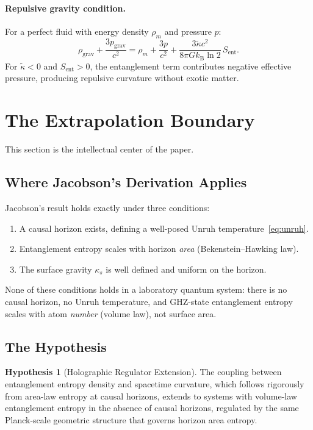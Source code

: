 \documentclass[12pt,letterpaper]{article}
\theoremstyle{plain}
\theoremstyle{definition}
\newtheorem{hypothesis}[theorem]{Hypothesis}
\theoremstyle{remark}
\newcommand{\kB}{k_{\mathrm{B}}}
\newcommand{\lnTwo}{\ln 2}
\newcommand{\kt}{\tilde{\kappa}}
\newcommand{\Sent}{S_{\mathrm{ent}}}
\begin{document}
\paragraph{Repulsive gravity condition.}
For a perfect fluid with energy density $\rho_{m}$ and pressure $p$:
\begin{equation}
  \rho_{\mathrm{grav}} + \frac{3p_{\mathrm{grav}}}{c^{2}}
  = \rho_{m} + \frac{3p}{c^{2}}
    + \frac{3\kt c^{2}}{8\pi G\kB\lnTwo}\,\Sent.
  \label{eq:source}
\end{equation}
For $\kt < 0$ and $\Sent > 0$, the entanglement term contributes negative effective pressure,
producing repulsive curvature without exotic matter.

\section{The Extrapolation Boundary}
\label{sec:boundary}

This section is the intellectual center of the paper.

\subsection{Where Jacobson's Derivation Applies}

Jacobson's result holds exactly under three conditions:
\begin{enumerate}
  \item A causal horizon exists, defining a well-posed Unruh temperature~\eqref{eq:unruh}.
  \item Entanglement entropy scales with horizon \emph{area} (Bekenstein--Hawking law).
  \item The surface gravity $\kappa_{s}$ is well defined and uniform on the horizon.
\end{enumerate}
None of these conditions holds in a laboratory quantum system: there is no causal horizon,
no Unruh temperature, and GHZ-state entanglement entropy scales with atom \emph{number}
(volume law), not surface area.

\subsection{The Hypothesis}

\begin{hypothesis}[Holographic Regulator Extension]
\label{hyp:extension}
The coupling between entanglement entropy density and spacetime curvature, which follows
rigorously from area-law entropy at causal horizons, extends to systems with volume-law
entanglement entropy in the absence of causal horizons, regulated by the same Planck-scale
geometric structure that governs horizon area entropy.
\end{hypothesis}
\end{document}
